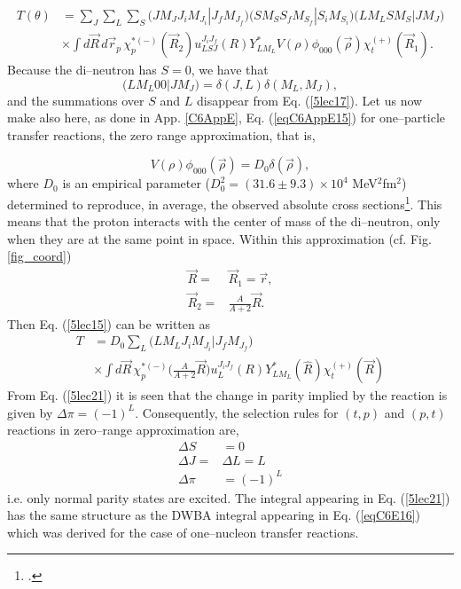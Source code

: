 \begin{subappendices}
\begin{equation}
\begin{split}
T(\theta)&= \sum_J\sum_L\sum_S \bigl( J M_J J_i M_{J_i}|J_f M_{J_f} \bigr) \bigl( S M_S S_f M_{S_f}|S_i M_{S_i}\bigr)
 \bigl( L M_L S M_{S}|J M_{J} \bigr) \\
&\times \int d\vec R\,d\vec r_p\, \chi^{*(-)}_p(\vec R_2)
 u^{J_i J_f}_{LSJ}(R) Y_{L M_L}^*V(\rho) \phi_{000}(\vec \rho) \chi^{(+)}_t(\vec R_1).
\end{split}
\end{equation}
Because the di--neutron has $S=0$, we have that
\begin{equation}\label{5lec18}
 \bigl( L M_L 0 0|J M_{J} \bigr)=\delta(J,L)\delta(M_L,M_J),
\end{equation}
and the summations over $S$ and $L$ disappear from Eq. (\ref{5lec17}). Let us now  make also here, as done in App. \ref{C6AppE}, Eq. (\ref{eqC6AppE15}) for one--particle transfer reactions, the zero range approximation, that is,


\begin{equation}\label{5lec19}
V(\rho) \phi_{000}(\vec \rho)=D_0 \delta(\vec \rho),
\end{equation}
where $D_0$ is an empirical parameter ($D_0^2=(31.6\pm9.3)\times10^4$ MeV$^2$fm$^2$) determined to reproduce, in average, the observed absolute cross sections\footnote{\cite{Broglia:73}.}.
This means that the proton interacts with the center of mass of the di--neutron, only when they are at the same point in space.
Within this approximation (cf. Fig. \ref{fig_coord})
\begin{equation}\label{5lec20}
\begin{split}
\vec R=&\vec R_1=\vec r,\\
\vec R_2=&\frac{A}{A+2}\vec R.
\end{split}
\end{equation}
Then Eq. (\ref{5lec15}) can be written as
\begin{equation}\label{5lec21}
\begin{split}
T&= D_0 \sum_L \bigl( L M_L J_i M_{J_i}|J_f M_{J_f} \bigr) \\
&\times \int d\vec R\, \chi^{*(-)}_p\bigl(\frac{A}{A+2}\vec R\bigr)
 u^{J_i J_f}_{L}(R) Y_{L M_L}^*(\hat R) \chi^{(+)}_t(\vec R)
\end{split}
\end{equation}
From Eq. (\ref{5lec21}) it is seen that the change in parity implied by the reaction is given by $\Delta\pi=(-1)^L$. Consequently, the selection rules for $(t,p)$ and  $(p,t)$ reactions in zero--range approximation are,
\begin{equation}\label{5lec22}
\begin{split}
\Delta S&=0\\
\Delta J=&\Delta L=L \\
\Delta\pi&=(-1)^L
\end{split}
\end{equation}
i.e. only normal parity states are excited.
The integral appearing in Eq. (\ref{5lec21}) has the same structure as the DWBA integral appearing in Eq. (\ref{eqC6E16}) which was derived for the case of one--nucleon transfer reactions.



\end{subappendices}
